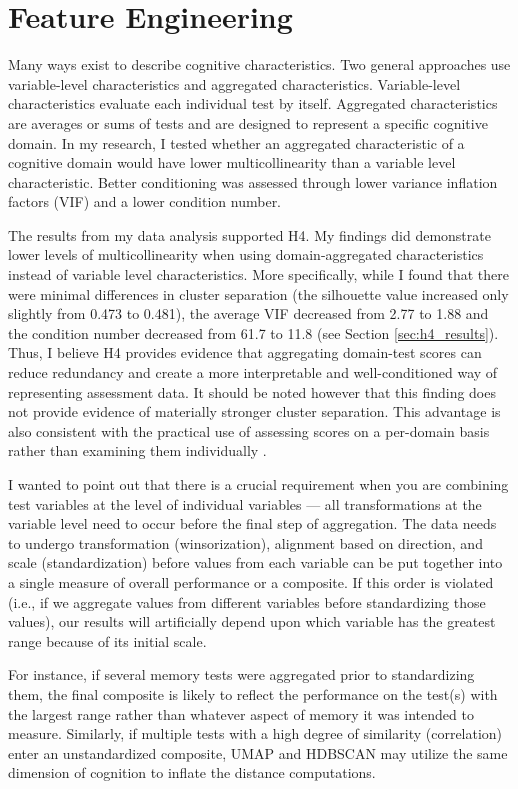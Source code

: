 \section{Feature Engineering}
Many ways exist to describe cognitive characteristics. Two general approaches use variable-level characteristics and aggregated characteristics. Variable-level characteristics evaluate each individual test by itself. Aggregated characteristics are averages or sums of tests and are designed to represent a specific cognitive domain. In my research, I tested whether an aggregated characteristic of a cognitive domain would have lower multicollinearity than a variable level characteristic. Better conditioning was assessed through lower variance inflation factors (VIF) and a lower condition number.

The results from my data analysis supported H4. My findings did demonstrate lower levels of multicollinearity when using domain-aggregated characteristics instead of variable level characteristics. More specifically, while I found that there were minimal differences in cluster separation (the silhouette value increased only slightly from 0.473 to 0.481), the average VIF decreased from 2.77 to 1.88 and the condition number decreased from 61.7 to 11.8 (see Section \ref{sec:h4_results}). Thus, I believe H4 provides evidence that aggregating domain-test scores can reduce redundancy and create a more interpretable and well-conditioned way of representing assessment data. It should be noted however that this finding does not provide evidence of materially stronger cluster separation. This advantage is also consistent with the practical use of assessing scores on a per-domain basis rather than examining them individually \parencite{lezak2012neuropsychological}.

I wanted to point out that there is a crucial requirement when you are combining test variables at the level of individual variables --- all transformations at the variable level need to occur before the final step of aggregation. The data needs to undergo transformation (winsorization), alignment based on direction, and scale (standardization) before values from each variable can be put together into a single measure of overall performance or a composite. If this order is violated (i.e., if we aggregate values from different variables before standardizing those values), our results will artificially depend upon which variable has the greatest range because of its initial scale.

For instance, if several memory tests were aggregated prior to standardizing them, the final composite is likely to reflect the performance on the test(s) with the largest range rather than whatever aspect of memory it was intended to measure. Similarly, if multiple tests with a high degree of similarity (correlation) enter an unstandardized composite, UMAP and HDBSCAN may utilize the same dimension of cognition to inflate the distance computations.

